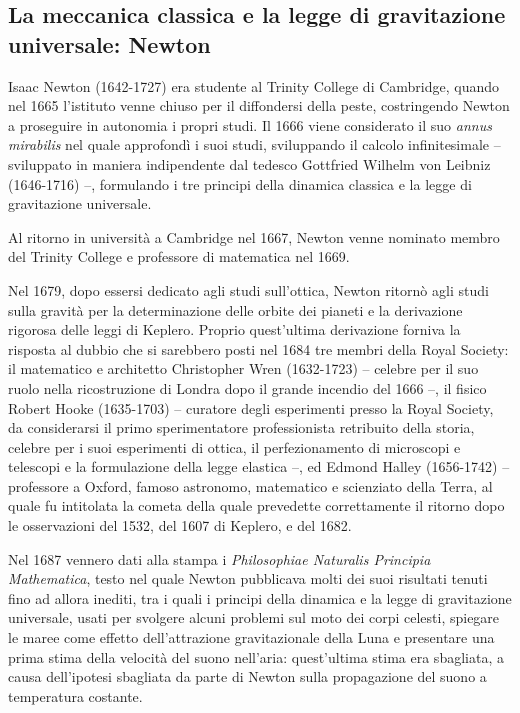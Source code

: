 \subsection{La meccanica classica e la legge di gravitazione universale: Newton}
Isaac Newton (1642-1727) era studente al Trinity College di Cambridge, quando nel 1665 l'istituto venne chiuso per il diffondersi della peste, costringendo Newton a proseguire in autonomia i propri studi. Il 1666 viene considerato il suo \textit{annus mirabilis} nel quale approfondì i suoi studi, sviluppando il calcolo infinitesimale -- sviluppato in maniera indipendente dal tedesco Gottfried Wilhelm von Leibniz (1646-1716) --, formulando i tre principi della dinamica classica e la legge di gravitazione universale.

Al ritorno in università a Cambridge nel 1667, Newton venne nominato membro del Trinity College e professore di matematica nel 1669.

Nel 1679, dopo essersi dedicato agli studi sull'ottica, Newton ritornò agli studi sulla gravità per la determinazione delle orbite dei pianeti e la derivazione rigorosa delle leggi di Keplero. Proprio quest'ultima derivazione forniva la risposta al dubbio che si sarebbero posti nel 1684 tre membri della Royal Society: il matematico e architetto Christopher Wren (1632-1723) -- celebre per il suo ruolo nella ricostruzione di Londra dopo il grande incendio del 1666 --, il fisico Robert Hooke (1635-1703) -- curatore degli esperimenti presso la Royal Society, da considerarsi il primo sperimentatore professionista retribuito della storia, celebre per i suoi esperimenti di ottica, il perfezionamento di microscopi e telescopi e la formulazione della legge elastica --, ed Edmond Halley (1656-1742) -- professore a Oxford, famoso astronomo, matematico e scienziato della Terra, al quale fu intitolata la cometa della quale prevedette correttamente il ritorno dopo le osservazioni del 1532, del 1607 di Keplero, e del 1682.

Nel 1687 vennero dati alla stampa i \textit{Philosophiae Naturalis Principia Mathematica}, testo nel quale Newton pubblicava molti dei suoi risultati tenuti fino ad allora inediti, tra i quali i principi della dinamica e la legge di gravitazione universale, usati per svolgere alcuni problemi sul moto dei corpi celesti, spiegare le maree come effetto dell'attrazione gravitazionale della Luna e presentare una prima stima della velocità del suono nell'aria: quest'ultima stima era sbagliata, a causa dell'ipotesi sbagliata da parte di Newton sulla propagazione del suono a temperatura costante.

